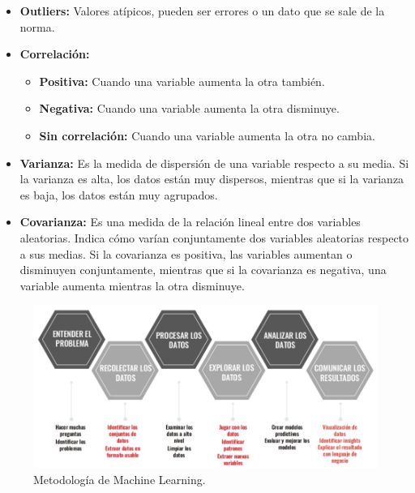 \documentclass[../main.tex]{subfiles}
\begin{document}
        \begin{itemize}
            \item \textbf{Outliers:} Valores atípicos, pueden ser errores o un dato que se sale de la norma.
            \item \textbf{Correlación:} 
                \begin{itemize}
                    \item \textbf{Positiva:} Cuando una variable aumenta la otra también.
                    \item \textbf{Negativa:} Cuando una variable aumenta la otra disminuye.
                    \item \textbf{Sin correlación:} Cuando una variable aumenta la otra no cambia.
                \end{itemize}
            \item \textbf{Varianza:} Es la medida de dispersión de una variable respecto a su media. Si la varianza es alta, los datos están muy dispersos, mientras que si la varianza es baja, los datos están muy agrupados.
            \item \textbf{Covarianza:} Es una medida de la relación lineal entre dos variables aleatorias. Indica cómo varían conjuntamente dos variables aleatorias respecto a sus medias. Si la covarianza es positiva, las variables aumentan o disminuyen conjuntamente, mientras que si la covarianza es negativa, una variable aumenta mientras la otra disminuye.
        \end{itemize}

        \begin{figure}[htb]
            \centering
            \includegraphics[scale=0.4]{./images/machine.jpg}
            \caption{Metodología de Machine Learning.}
            \label{fig:figura1}
        \end{figure}
    
\end{document}
